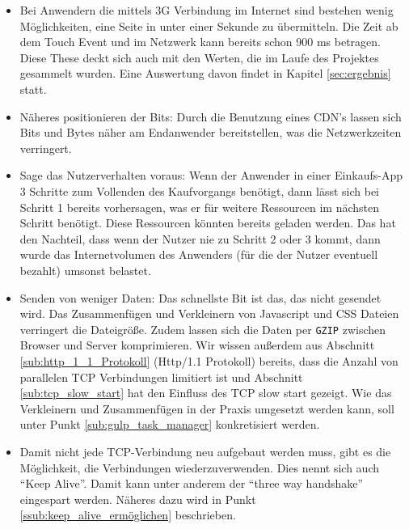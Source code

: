 \begin{itemize}
			Die Weiterleitung von hasbro.com auf www.hasbro.com ist für die Suchmaschinenoptimierung\footnote{engl. SEO - Search engine optimization} allerdings sinnvoll, denn sonst würde unter zwei Namen der gleiche Inhalt zu finden sein. Dies ist aus Sicht von Google "`Duplicated Content"' und kann zu einer Abstrafung im Ranking führen.\footnote{Mehr zu diesem Thema gibt es unter \url{http://www.sem-deutschland.de/seo-tipps/duplicate-content-definition/}}

			\item Bei Anwendern die mittels 3G Verbindung im Internet sind bestehen wenig Möglichkeiten, eine Seite in unter einer Sekunde zu übermitteln. Die Zeit ab dem Touch Event und im Netzwerk kann bereits schon 900 ms betragen. Diese These deckt sich auch mit den Werten, die im Laufe des Projektes gesammelt wurden. Eine Auswertung davon findet in Kapitel \ref{sec:ergebnis} statt.

			\item Näheres positionieren der Bits: Durch die Benutzung eines CDN's lassen sich Bits und Bytes näher am Endanwender bereitstellen, was die Netzwerkzeiten verringert.

			\item Sage das Nutzerverhalten voraus: Wenn der Anwender in einer Einkaufs-App 3 Schritte zum Vollenden des Kaufvorgangs benötigt, dann lässt sich bei Schritt 1 bereits vorhersagen, was er für weitere Ressourcen im nächsten Schritt benötigt. Diese Ressourcen könnten bereits geladen werden. Das hat den Nachteil, dass wenn der Nutzer nie zu Schritt 2 oder 3 kommt, dann wurde das Internetvolumen des Anwenders (für die der Nutzer eventuell bezahlt) umsonst belastet.

			\item Senden von weniger Daten: Das schnellste Bit ist das, das nicht gesendet wird. Das Zusammenfügen und Verkleinern von Javascript und CSS Dateien verringert die Dateigröße. Zudem lassen sich die Daten per \texttt{GZIP} zwischen Browser und Server komprimieren. Wir wissen außerdem aus Abschnitt \ref{sub:http_1_1_Protokoll} (Http/1.1 Protokoll) bereits, dass die Anzahl von parallelen TCP Verbindungen limitiert ist und Abschnitt \ref{sub:tcp_slow_start} hat den Einfluss des TCP slow start gezeigt. Wie das Verkleinern und Zusammenfügen in der Praxis umgesetzt werden kann, soll unter Punkt \ref{sub:gulp_task_manager} konkretisiert werden.

			\item Damit nicht jede TCP-Verbindung neu aufgebaut werden muss, gibt es die Möglichkeit, die Verbindungen wiederzuverwenden. Dies nennt sich auch "`Keep Alive"'. Damit kann unter anderem der "`three way handshake"' eingespart werden. Näheres dazu wird in Punkt \ref{ssub:keep_alive_ermöglichen} beschrieben.


\end{itemize}
